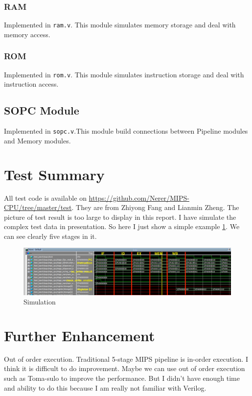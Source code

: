 \documentclass[paper=a4, fontsize=11pt]{scrartcl} %
\numberwithin{equation}{section} %
\numberwithin{figure}{section} %
\numberwithin{table}{section} %
\begin{document}
\begin{spacing}{1.5}
    	\subsubsection{RAM}Implemented in \verb|ram.v|. This module simulates memory storage and deal with memory access.
    	\subsubsection{ROM}Implemented in \verb|rom.v|. This module simulates instruction storage and deal with instruction access.
    \subsection{SOPC Module}
    	Implemented in \verb|sopc.v|.This module build connections between Pipeline modules and Memory modules.
\section{Test Summary}
	All test code is available on \url{https://github.com/Nerer/MIPS-CPU/tree/master/test}. They are from Zhiyong Fang and Lianmin Zheng. The picture of test result is too large to display in this report. I have simulate the complex test data in presentation. So here I just show a simple example \ref{fig::sim}. We can see clearly five stages in it.
	\begin{figure}[H]
		\centering
		\includegraphics[width = 13 cm]{sim}
		\caption{Simulation}
		\label{fig::sim}
	\end{figure}
	
	
\section{Further Enhancement}
		Out of order execution. Traditional 5-stage MIPS pipeline is in-order execution. I think it is difficult to do improvement. Maybe we can use out of order execution such as Toma-sulo to improve the performance. But I didn't have enough time and ability to do this because I am really not familiar with Verilog.

\end{spacing}
\end{document}
